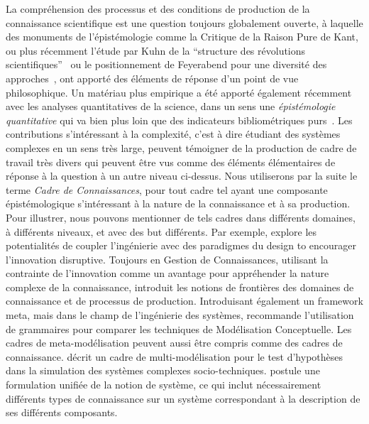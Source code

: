 {La compréhension des processus et des conditions de production de la connaissance scientifique est une question toujours globalement ouverte, à laquelle des monuments de l'épistémologie comme la Critique de la Raison Pure de Kant, ou plus récemment l'étude par Kuhn de la ``structure des révolutions scientifiques''~\cite{kuhn1970structure} ou le positionnement de Feyerabend pour une diversité des approches~\cite{feyerabend1993against}, ont apporté des éléments de réponse d'un point de vue philosophique. Un matériau plus empirique a été apporté également récemment avec les analyses quantitatives de la science, dans un sens une \emph{épistémologie quantitative} qui va bien plus loin que des indicateurs bibliométriques purs~\cite{cronin2014beyond}. Les contributions s'intéressant à la complexité, c'est à dire étudiant des systèmes complexes en un sens très large, peuvent témoigner de la production de cadre de travail très divers qui peuvent être vus comme des éléments élémentaires de réponse à la question à un autre niveau ci-dessus. Nous utiliserons par la suite le terme \emph{Cadre de Connaissances}, pour tout cadre tel ayant une composante épistémologique s'intéressant à la nature de la connaissance et à sa production. Pour illustrer, nous pouvons mentionner de tels cadres dans différents domaines, à différents niveaux, et avec des but différents. Par exemple, \cite{durantin2017disruptive} explore les potentialités de coupler l'ingénierie avec des paradigmes du design to encourager l'innovation disruptive. Toujours en Gestion de Connaissances, utilisant la contrainte de l'innovation comme un avantage pour appréhender la nature complexe de la connaissance, \cite{carlile2004transferring} introduit les notions de frontières des domaines de connaissance et de processus de production. Introduisant également un framework meta, mais dans le champ de l'ingénierie des systèmes, \cite{gemino2004framework} recommande l'utilisation de grammaires pour comparer les techniques de Modélisation Conceptuelle. Les cadres de meta-modélisation peuvent aussi être compris comme des cadres de connaissance. \cite{cottineau2015modular} décrit un cadre de multi-modélisation pour le test d'hypothèses dans la simulation des systèmes complexes socio-techniques. \cite{golden2012modeling} postule une formulation unifiée de la notion de système, ce qui inclut nécessairement différents types de connaissance sur un système correspondant à la description de ses différents composants.
}
 
